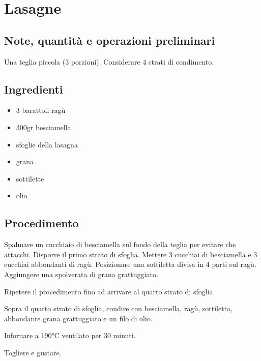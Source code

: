 \documentclass[12pt]{article}
\begin{document}
\newpage


\section{Lasagne}

\subsection*{Note, quantità e operazioni preliminari}
Una teglia piccola (3 porzioni).
Considerare 4 strati di condimento.

\bigskip
\bigskip

\begin{multicols}{2}
\subsection*{Ingredienti}
\begin{itemize}
	\item 3 barattoli ragù
	\item 300gr besciamella
	\item sfoglie della lasagna
	\item grana
	\item sottilette
	\item olio
\end{itemize}

\vspace*{\fill}

\columnbreak
\subsection*{Procedimento}

Spalmare un cucchiaio di besciamella sul fondo della teglia
per evitare che attacchi. Disporre il primo strato di sfoglia. 
Mettere 3 cucchiai di besciamella e 3 cucchiai abbondanti
di ragù. Posizionare una sottiletta divisa in 4 parti sul ragù.
Aggiungere una spolverata di grana grattuggiato.
\medskip

Ripetere il procedimento fino ad arrivare al quarto strato di 
sfoglia.
\medskip

Sopra il quarto strato di sfoglia, condire con besciamella,
ragù, sottiletta, abbondante grana grattuggiato e un filo di olio.
\medskip

Infornare a 190°C ventilato per 30 minuti.
\medskip

Togliere e gustare.

\end{multicols}
\end{document}
